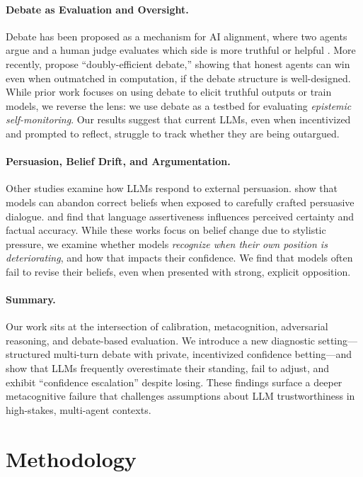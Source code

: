 \documentclass[11pt]{article}
\begin{document}
\paragraph{Debate as Evaluation and Oversight.}
Debate has been proposed as a mechanism for AI alignment, where two agents argue and a human judge evaluates which side is more truthful or helpful \citep{irving2018debate}. More recently, \citet{browncohen2023debate} propose ``doubly-efficient debate,'' showing that honest agents can win even when outmatched in computation, if the debate structure is well-designed. While prior work focuses on using debate to elicit truthful outputs or train models, we reverse the lens: we use debate as a testbed for evaluating \textit{epistemic self-monitoring}. Our results suggest that current LLMs, even when incentivized and prompted to reflect, struggle to track whether they are being outargued.

\paragraph{Persuasion, Belief Drift, and Argumentation.}
Other studies examine how LLMs respond to external persuasion. \citet{xu2023earthflat} show that models can abandon correct beliefs when exposed to carefully crafted persuasive dialogue. \citet{zhou2023epistemic} and \citet{rivera2023assertive} find that language assertiveness influences perceived certainty and factual accuracy. While these works focus on belief change due to stylistic pressure, we examine whether models \textit{recognize when their own position is deteriorating}, and how that impacts their confidence. We find that models often fail to revise their beliefs, even when presented with strong, explicit opposition.

\paragraph{Summary.}
Our work sits at the intersection of calibration, metacognition, adversarial reasoning, and debate-based evaluation. We introduce a new diagnostic setting—structured multi-turn debate with private, incentivized confidence betting—and show that LLMs frequently overestimate their standing, fail to adjust, and exhibit ``confidence escalation'' despite losing. These findings surface a deeper metacognitive failure that challenges assumptions about LLM trustworthiness in high-stakes, multi-agent contexts.


\section{Methodology}
\end{document}
